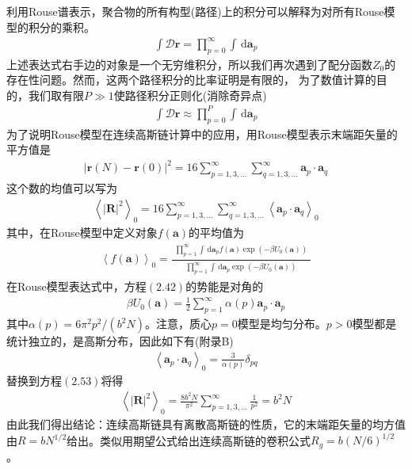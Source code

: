 利用Rouse谱表示，聚合物的所有构型(路径)上的积分可以解释为对所有Rouse模型的积分的乘积。
\begin{gather}
\int \mathcal{D}\mathbf{r}= \prod_{p=0}^{\infty} \int \, \mathrm{d} \mathbf{a}_p
\end{gather}
上述表达式右手边的对象是一个无穷维积分，所以我们再次遇到了配分函数$Z_0$的存在性问题。然而，这两个路径积分的比率证明是有限的，
为了数值计算的目的，我们取有限$P\gg1$使路径积分正则化(消除奇异点)
\begin{gather}
\int \mathcal{D}\mathbf{r}\approx \prod_{p=0}^{P} \int \, \mathrm{d} \mathbf{a}_p\end{gather}
为了说明Rouse模型在连续高斯链计算中的应用，用Rouse模型表示末端距矢量的平方值是
\begin{gather}
\left | \mathbf{r}(N)-\mathbf{r}(0) \right |^2=16\sum_{p=1,3,...}^{\infty}\sum_{q=1,3,...}^{\infty} \mathbf{a}_p \cdot \mathbf{a}_q
\end{gather}
这个数的均值可以写为
\begin{gather}
\left \langle \left| \mathbf{R} \right|^2 \right \rangle _0=16\sum_{p=1,3,...}^{\infty}\sum_{q=1,3,...}^{\infty} \left \langle \mathbf{a}_p \cdot \mathbf{a}_q \right \rangle _0
\end{gather}
其中，在Rouse模型中定义对象$f(\mathbf{a})$的平均值为
\begin{gather}
\left \langle f(\mathbf{a}) \right \rangle _0=\frac{\begin{matrix} \prod_{p=1}^{\infty} \int \, \mathrm{d} \mathbf{a}_p f(\mathbf{a})\exp(-\beta U_0(\mathbf{a})) \end{matrix}}{\begin{matrix} \prod_{p=1}^{\infty} \int \, \mathrm{d} \mathbf{a}_p \exp(-\beta U_0(\mathbf{a})) \end{matrix}}
\end{gather}
在Rouse模型表达式中，方程$(2.42)$的势能是对角的
\begin{gather}
\beta U_0(\mathbf{a})=\frac{1}{2}\sum_{p=1}^{\infty}\alpha (p)\mathbf{a}_p \cdot \mathbf{a}_p
\end{gather}
其中$\alpha (p)=6\pi ^2p^2/(b^2N)$。注意，质心$p=0$模型是均匀分布。$p>0$模型都是统计独立的，是高斯分布，因此如下有(附录B)
\begin{gather}
\left \langle \mathbf{a}_p \cdot \mathbf{a}_q \right \rangle _0=\frac{3}{\alpha (p)}\delta _{pq}
\end{gather}
替换到方程$(2.53)$将得
\begin{gather}
\left \langle \left| \mathbf{R} \right|^2 \right \rangle _0=\frac{8b^2N}{\pi ^2}\sum_{p=1,3,...}^{\infty}\frac{1}{p^2}=b^2N
\end{gather}
由此我们得出结论：连续高斯链具有离散高斯链的性质，它的末端距矢量的均方值由$R=bN^{1/2}$给出。类似用期望公式给出连续高斯链的卷积公式$R_g=b(N/6)^{1/2}$。

